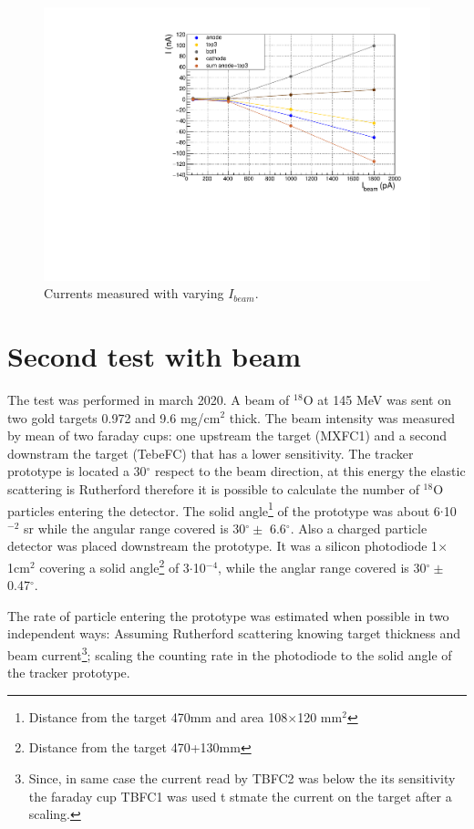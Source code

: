 \documentclass[a4paper, 11 pt]{report}
\newcommand{\ibeam}{$I_{beam}$}
\begin{document}
\begin{figure}[htbp]
	\centering
	\includegraphics[width=\textwidth]{Immagini/IbeamScan_THGEM10_10mbar_average.pdf}
	\caption{Currents measured with varying \ibeam.}
	\label{fig:IbeamScan_THGEM10_10mbar_average}
\end{figure}

\clearpage
\section{Second test with beam} 

The test was performed in march 2020.
A beam of $^{18}$O at 145 MeV was sent on two gold targets 0.972 and 9.6 mg/cm$^2$ thick.
The beam intensity was measured by mean of two faraday cups: one upstream the target
(MXFC1) and a second downstram the target (TebeFC) that has a lower sensitivity.
The tracker prototype is located a 30$^{\circ}$ respect to the beam direction, at this energy 
the elastic scattering is Rutherford therefore it is possible to calculate the number of 
$^{18}$O particles entering the detector.
The solid angle\footnote{Distance from the target 470mm and area 108$\times$120 mm$^2$} of the 
prototype was about 6$\cdot$10$^{-2}$ sr while the angular range covered is 30$^{\circ} \pm$ 
6.6$^{\circ}$. Also a charged particle detector was placed downstream the 
prototype. It was a silicon photodiode 1$\times$1cm$^2$ covering a solid angle\footnote{Distance 
from the target 470+130mm} of 3$\cdot$10$^{-4}$, while the anglar range covered is 30$^{\circ} \pm$ 0.47$^{\circ}$.

The rate of particle entering the prototype was estimated when possible in two independent
ways: Assuming Rutherford scattering knowing target thickness and beam current\footnote{Since,
in same case the current read by TBFC2 was below the its sensitivity the faraday cup 
TBFC1 was used t stmate the current on the target after a scaling.}; 
scaling the counting rate in the photodiode to the solid angle of the tracker prototype.
\end{document}
